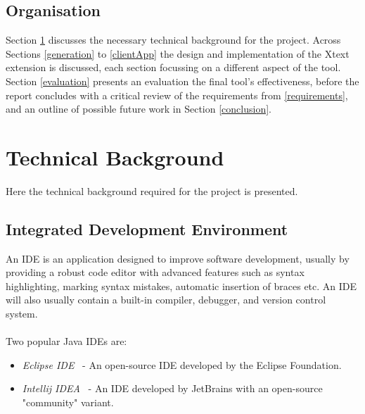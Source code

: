 \documentclass{article}
\begin{document}
\subsection{Organisation} 
Section \ref{technicalBackground} discusses the necessary technical background for the project. Across Sections \ref{generation} to \ref{clientApp} the design and implementation of the Xtext extension is discussed, each section focussing on a different aspect of the tool. Section \ref{evaluation} presents an evaluation the final tool's effectiveness, before the report concludes with a critical review of the requirements from \ref{requirements}, and an outline of possible future work in Section \ref{conclusion}. 


\section{Technical Background}\label{technicalBackground}
Here the technical background required for the project is presented.
\subsection{Integrated Development Environment}
An IDE is an application designed to improve software development, usually by providing a robust code editor with advanced features such as syntax highlighting, marking syntax mistakes, automatic insertion of braces etc. An IDE will also usually contain a built-in compiler, debugger, and version control system. 
\\
\\
Two popular Java IDEs are:
\begin{itemize}
\item \emph{Eclipse IDE}~\cite{eclipse} - An open-source IDE developed by the Eclipse Foundation.
\item \emph{Intellij IDEA}~\cite{intellij} - An IDE developed by JetBrains with an open-source "community" variant.
\end{itemize}
%
\end{document}
